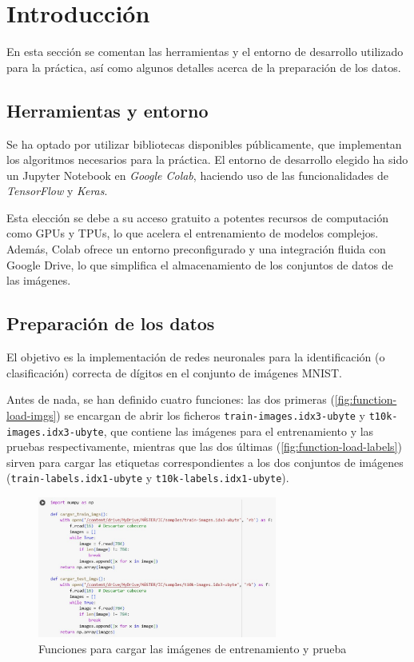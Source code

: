 \section{Introducción}
En esta sección se comentan las herramientas y el entorno de desarrollo utilizado para la práctica, así como algunos detalles acerca de la preparación de los datos.

\subsection{Herramientas y entorno}

Se ha optado por utilizar bibliotecas disponibles públicamente, que implementan los algoritmos necesarios para la práctica. El entorno de desarrollo elegido ha sido un Jupyter Notebook en \textit{Google Colab}, haciendo uso de las funcionalidades de \textit{TensorFlow} y \textit{Keras}.

Esta elección se debe a su acceso gratuito a potentes recursos de computación como GPUs y TPUs, lo que acelera el entrenamiento de modelos complejos. Además, Colab ofrece un entorno preconfigurado y una integración fluida con Google Drive, lo que simplifica el almacenamiento de los conjuntos de datos de las imágenes.

\subsection{Preparación de los datos}

El objetivo es la implementación de redes neuronales para la identificación (o clasificación) correcta de dígitos en el conjunto de imágenes MNIST.

Antes de nada, se han definido cuatro funciones: las dos primeras (\autoref{fig:function-load-imgs}) se encargan de abrir los ficheros \texttt{train-images.idx3-ubyte} y \texttt{t10k-images.idx3-ubyte}, que contiene las imágenes para el entrenamiento y las pruebas respectivamente, mientras que las dos últimas (\autoref{fig:function-load-labels}) sirven para cargar las etiquetas correspondientes a los dos conjuntos de imágenes (\texttt{train-labels.idx1-ubyte} y \texttt{t10k-labels.idx1-ubyte}).

\begin{figure}[H]
	\centering
	\includegraphics[width=0.7\textwidth]{imgs/function-load-imgs.JPG}
	\caption{Funciones para cargar las imágenes de entrenamiento y prueba}
	\label{fig:function-load-imgs}
\end{figure}

